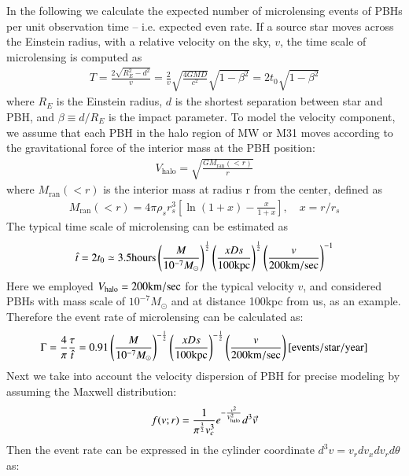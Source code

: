 \documentclass[iop, apj]{emulateapj}
\newcommand{\?}{\stackrel{?}{=}}
\begin{document}
In the following we calculate the expected number of microlensing events of PBHs per unit observation time -- i.e. expected even rate. 
If a source star moves across the Einstein radius, with a relative velocity on the sky, $v$, the time scale of microlensing is computed as
%
\begin{eqnarray}
T=\frac{2\sqrt{R^2_E-d^2}}{v} = \frac{2}{v} \sqrt{\frac{4GMD}{c^2}}\sqrt{1-\beta^2}=2t_0\sqrt{1-\beta^2}
\end{eqnarray}
%
where $R_E$ is the Einstein radius, $d$ is the shortest separation between star and PBH, and $\beta \equiv d/R_E$ is the impact parameter. 
To model the velocity component, we assume that each PBH in the halo region of MW or M31 moves according to the gravitational force of the interior mass at the PBH position: 
%
\begin{eqnarray}
V_\mathrm{halo}=\sqrt{\frac{GM_\mathrm{ran}(<r)}{r}}
\end{eqnarray}
%
where $M_\mathrm{ran}(<r)$ is the interior mass at radius r from the center, defined as
%
\begin{eqnarray}
M_\mathrm{ran}(<r)=4\pi\rho_sr^3_s\left[\ln(1+x)-\frac{x}{1+x}\right],\quad x=r/r_s
\end{eqnarray}
%
The typical time scale of microlensing can be estimated as
%
\begin{eqnarray}
\hat t =2t_0\simeq3.5{\rm hours} \left(\frac{M}{10^{-7}M_\odot}\right)^{\frac{1}{2}}\left(\frac{xDs}{100 \rm{kpc}}\right)^{\frac{1}{2}} \left(\frac{v}{200\rm{km/sec}}\right)^{-1}
\end{eqnarray}
%
Here we employed $V_\mathrm{halo}=200\rm{km/sec}$ for the typical velocity $v$, and considered PBHs with mass scale of $10^{-7}M_\odot$ and at distance 100kpc from us, as an example. 
Therefore the event rate of microlensing can be calculated as:
%
\begin{eqnarray}
\Gamma = \frac{4}{\pi}\frac{\tau}{\hat t}=0.91\left(\frac{M}{10^{-7}M_\odot}\right)^{-\frac{1}{2}}\left(\frac{xDs}{100 \rm{kpc}}\right)^{-\frac{1}{2}} \left(\frac{v}{200\rm{km/sec}}\right) [{\rm events/star/year}]
\end{eqnarray}
%
Next we take into account the velocity dispersion of PBH for precise modeling by assuming the Maxwell distribution: 
%
\begin{eqnarray}
f(v;r)=\frac{1}{\pi^{\frac{3}{2}}v^3_{c}}e^{-\frac{v^2}{V^2_{\rm halo}}}d^3 \vec{v}
\end{eqnarray}
%
Then the event rate can be expressed in the cylinder coordinate $d^3 v=v_r dv_x dv_r d\theta$ as: \citep{Griestetal:91}
\end{document}
